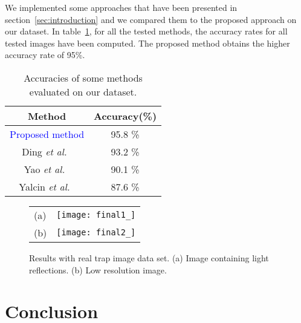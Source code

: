 \documentclass[a4paper,conference]{IEEEtran}
\begin{document}
We implemented some approaches that have been presented in section~\ref{sec:introduction} and we compared them to the proposed approach on our dataset. In table~\ref{tab:results}, for all the tested methods, the accuracy rates for all tested images have been computed. The proposed method obtains the higher accuracy rate of 95\%.

\begin{table}[!htb]
\caption{Accuracies of some methods evaluated on our dataset.}%
\label{tab:results}
\centering
\begin{tabular}{c|c}%
\hline
\hline
\textbf{Method} &
\textbf{Accuracy(\%)} \\ %
 \hline
\cellcolor{gray!50} \textcolor{blue}{Proposed method} & 
\cellcolor{gray!50} 95.8 \% \\
\hline
Ding \textit{et al.}~\cite{DBLP:journals/corr/DingT16}& 
93.2 \% \\
\hline
\cellcolor{gray!50} Yao \textit{et al.}~\cite{qing2012insect}& 
\cellcolor{gray!50} 90.1 \% \\
\hline
Yalcin \textit{et al.}~\cite{yalcin2015vision}& 
87.6 \% \\
\hline
\hline
\end{tabular}
\end{table}%


\begin{figure}[!t]
\centering
\begin{tabular}{m{}m{}}
(a)&\texttt{[image: final1\_]}\\
(b)&\texttt{[image: final2\_]}\\
\end{tabular}
\caption{Results with real trap image data set. (a) Image containing light reflections. (b) Low resolution image.}
\label{fig_result}
\end{figure}
\section{Conclusion}\label{sec:conclusion}
\end{document}
